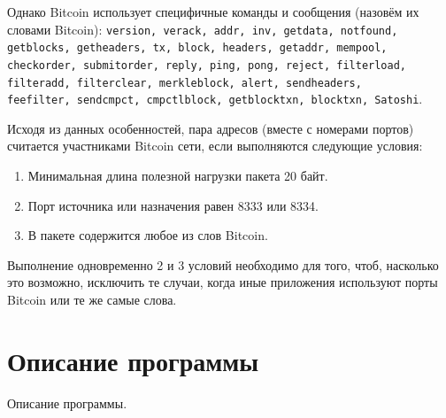 \documentclass[bachelor, och, coursework]{SCWorks}
\begin{document}
Однако Bitcoin использует специфичные команды и сообщения (назовём их словами Bitcoin): 
\texttt{version, verack, addr, inv, getdata, notfound, getblocks, getheaders, tx,  
block, headers, getaddr, mempool, \\ checkorder, submitorder, reply, ping, pong, reject, 
filterload, \\ filteradd, filterclear, merkleblock, alert, sendheaders, \\ feefilter,
sendcmpct, cmpctlblock, getblocktxn, blocktxn, Satoshi}.

Исходя из данных особенностей, пара адресов (вместе с номерами портов) считается участниками Bitcoin сети, если выполняются следующие условия:
\begin{enumerate}
    \item Минимальная длина полезной нагрузки пакета 20 байт.
    \item Порт источника или назначения равен 8333 или 8334.
    \item В пакете содержится любое из слов Bitcoin.
\end{enumerate}

Выполнение одновременно 2 и 3 условий необходимо для того, чтоб, насколько это возможно, исключить те случаи, когда иные приложения используют порты Bitcoin или те же самые слова.


\section{Описание программы}
Описание программы.



\end{document}
